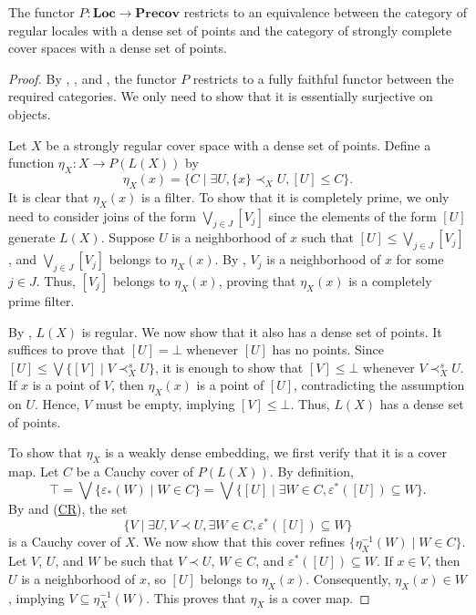 \documentclass[reqno]{amsart}
\newcommand{\axref}[1]{(\hyperref[ax:#1]{#1})}
\theoremstyle{definition}
\theoremstyle{remark}
\numberwithin{figure}{section}
\newcommand{\rb}{\prec}
\newcommand{\cat}[1]{\mathbf{#1}}
\begin{document}
\begin{thm}
The functor $P : \cat{Loc} \to \cat{Precov}$ restricts to an equivalence between the category of regular locales with a dense set of points and the category of strongly complete cover spaces with a dense set of points.
\end{thm}
\begin{proof}
By , , and , the functor $P$ restricts to a fully faithful functor between the required categories.
We only need to show that it is essentially surjective on objects.

Let $X$ be a strongly regular cover space with a dense set of points.
Define a function $\eta_X : X \to P(L(X))$ by
\[ \eta_X(x) = \{ C \mid \exists U, \{ x \} \rb_X U, [U] \leq C \}. \]
It is clear that $\eta_X(x)$ is a filter.
To show that it is completely prime, we only need to consider joins of the form $\bigvee_{j \in J} [V_j]$ since the elements of the form $[U]$ generate $L(X)$.
Suppose $U$ is a neighborhood of $x$ such that $[U] \leq \bigvee_{j \in J} [V_j]$, and $\bigvee_{j \in J} [V_j]$ belongs to $\eta_X(x)$.
By , $V_j$ is a neighborhood of $x$ for some $j \in J$.
Thus, $[V_j]$ belongs to $\eta_X(x)$, proving that $\eta_X(x)$ is a completely prime filter.

By , $L(X)$ is regular.
We now show that it also has a dense set of points.
It suffices to prove that $[U] = \bot$ whenever $[U]$ has no points.
Since $[U] \leq \bigvee \{ [V] \mid V \rb^s_X U \}$, it is enough to show that $[V] \leq \bot$ whenever $V \rb^s_X U$.
If $x$ is a point of $V$, then $\eta_X(x)$ is a point of $[U]$, contradicting the assumption on $U$.
Hence, $V$ must be empty, implying $[V] \leq \bot$.
Thus, $L(X)$ has a dense set of points.

To show that $\eta_X$ is a weakly dense embedding, we first verify that it is a cover map.
Let $C$ be a Cauchy cover of $P(L(X))$.
By definition, 
\[
\top = \bigvee \{ \varepsilon_*(W) \mid W \in C \} = \bigvee \{ [U] \mid \exists W \in C, \varepsilon^*([U]) \subseteq W \}.
\]
By  and \axref{CR}, the set 
\[
\{ V \mid \exists U, V \rb U, \exists W \in C, \varepsilon^*([U]) \subseteq W \}
\]
is a Cauchy cover of $X$.
We now show that this cover refines $\{ \eta_X^{-1}(W) \mid W \in C \}$.
Let $V$, $U$, and $W$ be such that $V \rb U$, $W \in C$, and $\varepsilon^*([U]) \subseteq W$.
If $x \in V$, then $U$ is a neighborhood of $x$, so $[U]$ belongs to $\eta_X(x)$.
Consequently, $\eta_X(x) \in W$, implying $V \subseteq \eta_X^{-1}(W)$.
This proves that $\eta_X$ is a cover map.


\end{proof}
\end{document}
